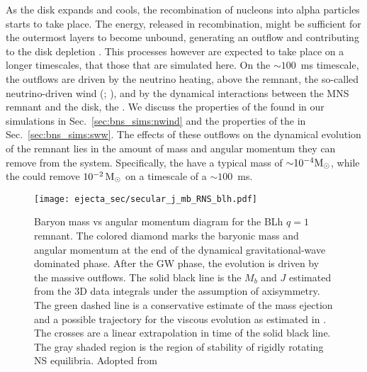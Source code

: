 As the disk expands and cools, the recombination of nucleons into alpha particles 
starts to take place. The energy, released in recombination, might be sufficient 
for the outermost layers to become unbound, generating an outflow and contributing 
to the disk depletion \citep{Beloborodov:2008nx,Lee:2009uc,Fernandez:2013tya}.
%
This processes however are expected to take place on a longer timescales,
that those that are simulated here. On the $\sim100$~ms timescale, the outflows 
are driven by the neutrino heating, above the remnant, the so-called neutrino-driven 
wind (\nwind; \citep{Dessart:2008zd,Perego:2014fma,Just:2014fka}), and by the dynamical 
interactions between the \ac{MNS} remnant and the disk, the \swind{} \citep{Nedora:2019jhl}.
%
We discuss the properties of the \nwind{} found in our simulations
in Sec.~\ref{sec:bns_sims:nwind} and the properties of the 
\swind{} in Sec.~\ref{sec:bns_sims:sww}.
The effects of these outflows on the dynamical evolution of the remnant 
lies in the amount of mass and angular momentum they can remove from the system.
%
Specifically, the \nwind{} have a typical mass of ${\sim} 10^{-4}{\text{M}_{\odot}}$, 
while the \swind{} could remove $10^{-2}\,{\text{M}_{\odot}}$ on a timescale of a $\sim100$~ms.

\begin{figure}[t]
    \centering 
    \texttt{[image: ejecta\_sec/secular\_j\_mb\_RNS\_blh.pdf]}
    \caption{Baryon mass vs angular momentum diagram for the BLh $q=1$ remnant.
        The colored diamond marks the baryonic mass and angular momentum at the end
        of the dynamical gravitational-wave dominated phase.
        After the GW phase, the evolution is driven by the massive outflows.
        The solid black line is the $M_b$ and $J$ estimated from the 3D data
        integrals under the assumption of axisymmetry.
        The green dashed line is a conservative estimate
        of the mass ejection and a possible trajectory for the viscous
        evolution as estimated in \citet{Radice:2018xqa}. The crosses are
        a linear extrapolation in time of the solid black line. The gray
        shaded region is the region of stability of rigidly rotating NS equilibria.
        Adopted from \cite{Nedora:2020pak}
    }
    \label{fig:total_j_mb_rns_blh}
\end{figure}


